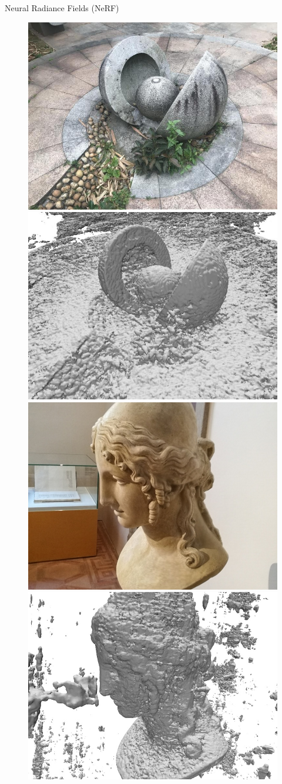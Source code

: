 \documentclass[10pt]{beamer}
\begin{document}
{\begin{frame}{Neural Radiance Fields (NeRF)}
    \begin{figure}
        \centering
        \includegraphics[width=0.35\linewidth]{figures/vol/nerf_surface/143.jpg}
        \includegraphics[width=0.35\linewidth]{figures/vol/nerf_surface/1.png} \\ \vspace{0.1em}
        \includegraphics[width=0.35\linewidth]{figures/vol/nerf_surface/32.jpg}
        \includegraphics[width=0.35\linewidth]{figures/vol/nerf_surface/2.png}
    \end{figure}
\end{frame}
}
\end{document}
